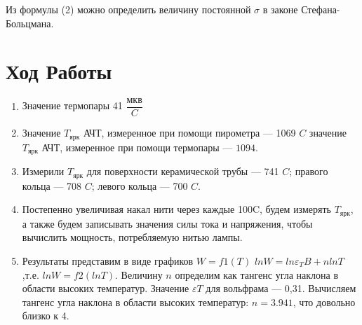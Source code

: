 \documentclass[a4paper,12pt]{article}
\theoremstyle{plain} %
\theoremstyle{definition} %
\theoremstyle{remark} %
\begin{document}
Из формулы (2) можно определить величину постоянной $\sigma$ в законе Стефана-Больцмана.

\section{Ход Работы}
\begin{enumerate}
    \item Значение термопары 41 $\dfrac{\text{мкв}}{{C}}$
    \item Значение $T_\text{ярк}$ АЧТ, измеренное при помощи пирометра — 1069 $C$ значение $T_\text{ярк}$ АЧТ, измеренное при помощи термопары — $1094$.
    \item Измерили $T_\text{ярк}$ для поверхности керамической трубы — 741 $C$; правого кольца — 708 $C$; левого кольца — 700 $C$.
    \item Постепенно увеличивая накал нити через каждые 100C, будем измерять $T_\text{ярк}$, а также будем записывать значения силы тока и напряжения, чтобы вычислить мощность, потребляемую нитью лампы.
    \item 
    Результаты представим в виде графиков $W =f1(T)$ $ln W =ln \varepsilon_T B + n lnT$,т.е. $lnW = f2(lnT)$. Величину $n$ определим как тангенс угла наклона в области высоких температур. Значение $\varepsilon T$ для вольфрама — 0,31. Вычисляем тангенс угла наклона в области высоких температур: $n = 3.941$, что довольно близко к 4.


\end{enumerate}
\end{document}
